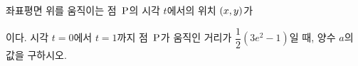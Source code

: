 \hspace*{2mm}\begin{minipage}[t]{\dimexpr\linewidth-2mm\relax}\vspace{0pt}
좌표평면 위를 움직이는 점~$\mathrm{P}$의 시각 $t$에서의 위치 $(x{,}\mkern3mu\mathopen{}y)$가 \par\smallskip{}\par\smallskip\noindent 이다. 시각 $t=0$에서 $t=1$까지 점~$\mathrm{P}$가 움직인 거리가 $\dfrac{1}{2}(3e^2-1)$일 때, 양수 $a$의 값을 구하시오.\end{minipage}
